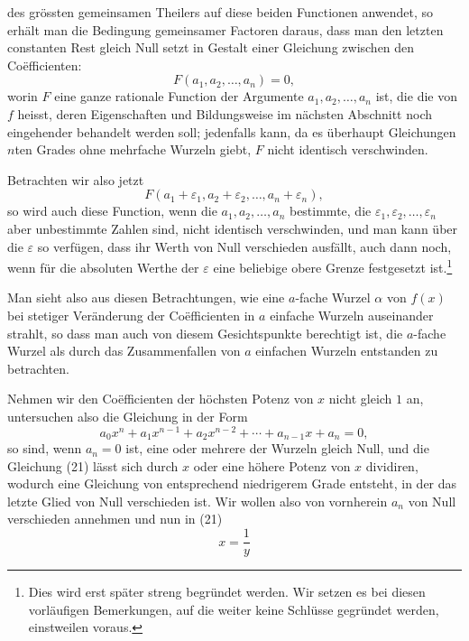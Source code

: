 
des grössten gemeinsamen Theilers auf diese beiden Functionen anwendet, so erhält man die Bedingung gemeinsamer Factoren daraus, dass man den letzten constanten Rest gleich Null setzt in Gestalt einer Gleichung zwischen den Coëfficienten:
\[
 F(a_1,a_2,\ldots,a_n)=0,
\]
worin $F$ eine ganze rationale Function der Argumente $a_1,a_2,
\ldots,a_n$ ist, die die  von $f$ heisst, deren Eigenschaften und Bildungsweise im nächsten Abschnitt noch eingehender behandelt werden soll; jedenfalls kann, da es überhaupt Gleichungen $n$ten Grades ohne mehrfache Wurzeln giebt, $F$ nicht identisch verschwinden.

Betrachten wir also jetzt
\[
 F(a_1+\varepsilon_1,a_2+\varepsilon_2,
\ldots,a_n+\varepsilon_n),
\]
so wird auch diese Function, wenn die $a_1,a_2,
\ldots,a_n$ bestimmte, die $\varepsilon_1,\varepsilon_2,
\ldots,\varepsilon_n$ aber unbestimmte Zahlen sind, nicht identisch verschwinden, und man kann über die $\varepsilon$ so verfügen, dass ihr Werth von Null verschieden ausfällt, auch dann noch, wenn für die absoluten Werthe der $\varepsilon$ eine beliebige obere Grenze festgesetzt ist.\footnote[1]{Dies wird erst später streng begründet werden. Wir setzen es bei diesen vorläufigen Bemerkungen, auf die weiter keine Schlüsse gegründet werden, einstweilen voraus.}

Man sieht also aus diesen Betrachtungen, wie eine $a$-fache Wurzel $\alpha$ von $f(x)$ bei stetiger Veränderung der Coëfficienten in $a$ einfache Wurzeln auseinander strahlt, so dass man auch von diesem Gesichtspunkte berechtigt ist, die $a$-fache Wurzel als durch das Zusammenfallen von $a$ einfachen Wurzeln entstanden zu betrachten.

Nehmen wir den Coëfficienten der höchsten Potenz von $x$ nicht gleich $1$ an, untersuchen also die Gleichung in der Form
\begin{equation}
 a_0x^n+a_1x^{n-1}+a_2x^{n-2}+\cdots+a_{n-1}x+a_n=0,
\tag{21}
\end{equation}
so sind, wenn $a_n=0$ ist, eine oder mehrere der Wurzeln gleich Null, und die Gleichung (21) lässt sich durch $x$ oder eine höhere Potenz von $x$ dividiren, wodurch eine Gleichung von entsprechend niedrigerem Grade entsteht, in der das letzte Glied von Null verschieden ist. Wir wollen also von vornherein $a_n$ von Null verschieden annehmen und nun in (21)
\begin{equation}
 x=\frac1y
\tag{22}
\end{equation}
